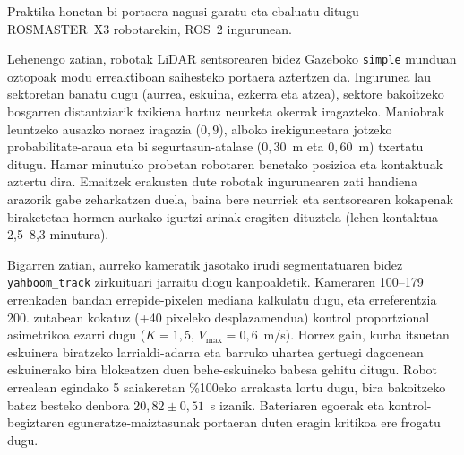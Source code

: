 Praktika honetan bi portaera nagusi garatu eta ebaluatu ditugu ROSMASTER~X3 robotarekin, ROS~2 ingurunean.

Lehenengo zatian, robotak LiDAR sentsorearen bidez Gazeboko \texttt{simple} munduan oztopoak modu erreaktiboan saihesteko portaera aztertzen da. Ingurunea lau sektoretan banatu dugu (aurrea, eskuina, ezkerra eta atzea), sektore bakoitzeko bosgarren distantziarik txikiena hartuz neurketa okerrak iragazteko. Maniobrak leuntzeko ausazko noraez iragazia ($0{,}9$), alboko irekiguneetara jotzeko probabilitate-araua eta bi segurtasun-atalase ($0{,}30$~m eta $0{,}60$~m) txertatu ditugu. Hamar minutuko probetan robotaren benetako posizioa eta kontaktuak aztertu dira. Emaitzek erakusten dute robotak ingurunearen zati handiena arazorik gabe zeharkatzen duela, baina bere neurriek eta sentsorearen kokapenak biraketetan hormen aurkako igurtzi arinak eragiten dituztela (lehen kontaktua 2{,}5--8{,}3 minutura).

Bigarren zatian, aurreko kameratik jasotako irudi segmentatuaren bidez \texttt{yahboom\_track} zirkuituari jarraitu diogu kanpoaldetik. Kameraren 100--179 errenkaden bandan errepide-pixelen mediana kalkulatu dugu, eta erreferentzia 200. zutabean kokatuz (+40 pixeleko desplazamendua) kontrol proportzional asimetrikoa ezarri dugu ($K = 1{,}5$, $V_{\max} = 0{,}6$~m/s). Horrez gain, kurba itsuetan eskuinera biratzeko larrialdi-adarra eta barruko uhartea gertuegi dagoenean eskuinerako bira blokeatzen duen behe-eskuineko babesa gehitu ditugu. Robot errealean egindako 5 saiakeretan \%100eko arrakasta lortu dugu, bira bakoitzeko batez besteko denbora $20{,}82 \pm 0{,}51$~s izanik. Bateriaren egoerak eta kontrol-begiztaren eguneratze-maiztasunak portaeran duten eragin kritikoa ere frogatu dugu.
